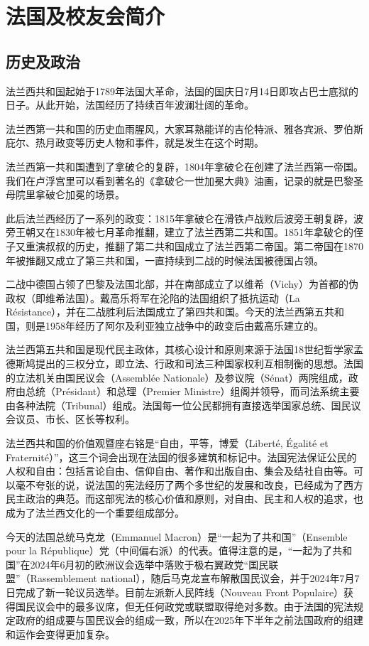\section{法国及校友会简介}
\subsection{历史及政治}

法兰西共和国起始于1789年法国大革命，法国的国庆日7月14日即攻占巴士底狱的日子。从此开始，法国经历了持续百年波澜壮阔的革命。

法兰西第一共和国的历史血雨腥风，大家耳熟能详的吉伦特派、雅各宾派、罗伯斯庇尔、热月政变等历史人物和事件，就是发生在这个时期。

法兰西第一共和国遭到了拿破仑的复辟，1804年拿破仑在创建了法兰西第一帝国。我们在卢浮宫里可以看到著名的《拿破仑一世加冕大典》油画，记录的就是巴黎圣母院里拿破仑加冕的场景。

此后法兰西经历了一系列的政变：1815年拿破仑在滑铁卢战败后波旁王朝复辟，波旁王朝又在1830年被七月革命推翻，建立了法兰西第二共和国。1851年拿破仑的侄子又重演叔叔的历史，推翻了第二共和国成立了法兰西第二帝国。第二帝国在1870年被推翻又成立了第三共和国，一直持续到二战的时候法国被德国占领。

二战中德国占领了巴黎及法国北部，并在南部成立了以维希（Vichy）为首都的伪政权（即维希法国）。戴高乐将军在沦陷的法国组织了抵抗运动（La Résistance），并在二战胜利后法国成立了第四共和国。今天的法兰西第五共和国，则是1958年经历了阿尔及利亚独立战争中的政变后由戴高乐建立的。

法兰西第五共和国是现代民主政体，其核心设计和原则来源于法国18世纪哲学家孟德斯鸠提出的三权分立，即立法、行政和司法三种国家权利互相制衡的思想。法国的立法机关由国民议会（Assemblée Nationale）及参议院（Sénat）两院组成，政府由总统（Présidant）和总理（Premier Ministre）组阁并领导，而司法系统主要由各种法院（Tribunal）组成。法国每一位公民都拥有直接选举国家总统、国民议会议员、市长、区长等权利。

法兰西共和国的价值观暨座右铭是“自由，平等，博爱（Liberté, Égalité et Fraternité）”，这三个词会出现在法国的很多建筑和标记中。法国宪法保证公民的人权和自由：包括言论自由、信仰自由、著作和出版自由、集会及结社自由等。可以毫不夸张的说，说法国的宪法经历了两个多世纪的发展和改良，已经成为了西方民主政治的典范。而这部宪法的核心价值和原则，对自由、民主和人权的追求，也成为了法兰西文化的一个重要组成部分。

今天的法国总统马克龙（Emmanuel Macron）是“一起为了共和国”（Ensemble pour la République）党（中间偏右派）的代表。值得注意的是，“一起为了共和国”在2024年6月初的欧洲议会选举中落败于极右翼政党“国民联盟”（Rassemblement national），随后马克龙宣布解散国民议会，并于2024年7月7日完成了新一轮议员选举。目前左派新人民阵线（Nouveau Front Populaire）获得国民议会中的最多议席，但无任何政党或联盟取得绝对多数。由于法国的宪法规定政府的组成要与国民议会的组成一致，所以在2025年下半年之前法国政府的组建和运作会变得更加复杂。


